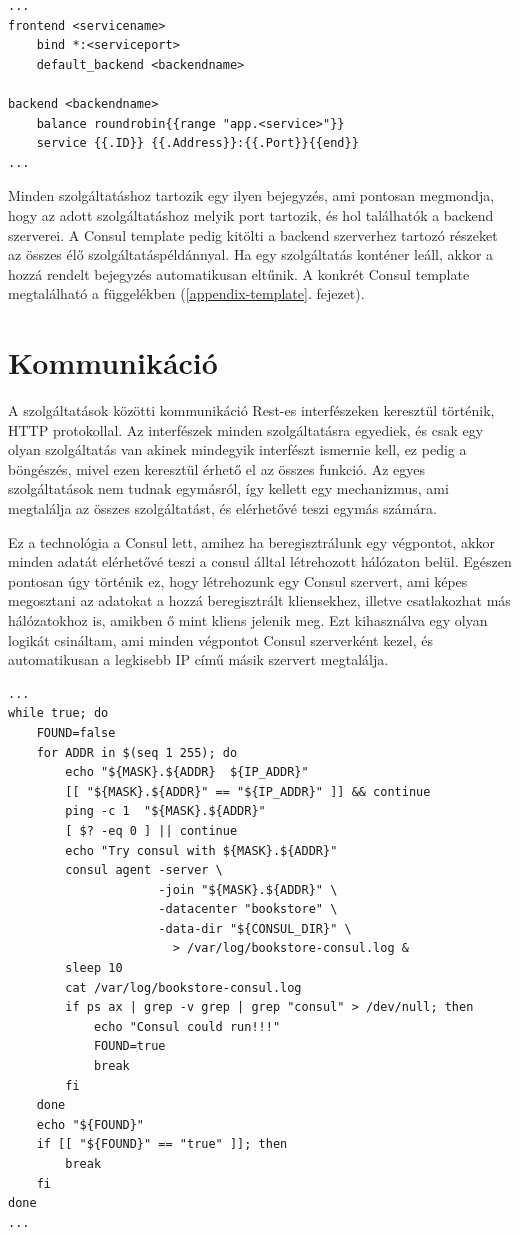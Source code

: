 \documentclass[11pt,magyar,a4paper,twoside,]{report}
\begin{document}
\begin{verbatim}
...
frontend <servicename>
    bind *:<serviceport>
    default_backend <backendname>

backend <backendname>
    balance roundrobin{{range "app.<service>"}}
    service {{.ID}} {{.Address}}:{{.Port}}{{end}}
...
\end{verbatim}

Minden szolgáltatáshoz tartozik egy ilyen bejegyzés, ami pontosan
megmondja, hogy az adott szolgáltatáshoz melyik port tartozik, és hol
találhatók a backend szerverei. A Consul template pedig kitölti a
backend szerverhez tartozó részeket az összes élő
szolgáltatáspéldánnyal. Ha egy szolgáltatás konténer leáll, akkor a
hozzá rendelt bejegyzés automatikusan eltűnik. A konkrét Consul template
megtalálható a függelékben (\ref{appendix-template}. fejezet).

\section{Kommunikáció}\label{kommunikuxe1ciuxf3-1}

A szolgáltatások közötti kommunikáció Rest-es interfészeken keresztül
történik, HTTP protokollal. Az interfészek minden szolgáltatásra
egyediek, és csak egy olyan szolgáltatás van akinek mindegyik interfészt
ismernie kell, ez pedig a böngészés, mivel ezen keresztül érhető el az
összes funkció. Az egyes szolgáltatások nem tudnak egymásról, így
kellett egy mechanizmus, ami megtalálja az összes szolgáltatást, és
elérhetővé teszi egymás számára.

Ez a technológia a Consul lett, amihez ha beregisztrálunk egy végpontot,
akkor minden adatát elérhetővé teszi a consul álltal létrehozott
hálózaton belül. Egészen pontosan úgy történik ez, hogy létrehozunk egy
Consul szervert, ami képes megosztani az adatokat a hozzá beregisztrált
kliensekhez, illetve csatlakozhat más hálózatokhoz is, amikben ő mint
kliens jelenik meg. Ezt kihasználva egy olyan logikát csináltam, ami
minden végpontot Consul szerverként kezel, és automatikusan a legkisebb
IP című másik szervert megtalálja.

\begin{verbatim}
...
while true; do
    FOUND=false
    for ADDR in $(seq 1 255); do
        echo "${MASK}.${ADDR}  ${IP_ADDR}"
        [[ "${MASK}.${ADDR}" == "${IP_ADDR}" ]] && continue
        ping -c 1  "${MASK}.${ADDR}"
        [ $? -eq 0 ] || continue
        echo "Try consul with ${MASK}.${ADDR}"
        consul agent -server \
                     -join "${MASK}.${ADDR}" \
                     -datacenter "bookstore" \
                     -data-dir "${CONSUL_DIR}" \
                       > /var/log/bookstore-consul.log &
        sleep 10
        cat /var/log/bookstore-consul.log
        if ps ax | grep -v grep | grep "consul" > /dev/null; then
            echo "Consul could run!!!"
            FOUND=true
            break
        fi
    done
    echo "${FOUND}"
    if [[ "${FOUND}" == "true" ]]; then
        break
    fi
done
...
\end{verbatim}
\end{document}

